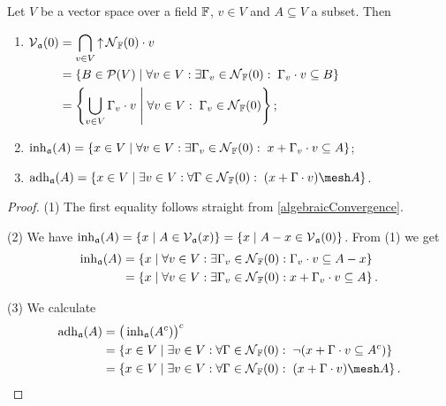 \begin{lemma} \label{constructionsInAlgebraicConvergence}
Let $V$ be a vector space over a field $\mathbb{F}$, $v\in V$ and $A\subseteq V$ a subset. Then
\begin{enumerate}
\item $\begin{aligned}[t]
\operatorname{\mathcal{V}}_\mathfrak{a}(0) &= \bigcap_{v\in V} \operatorname{\uparrow} \operatorname{\mathcal{N}}_{\mathbb{F}}(0)\cdot v \\
&= \left\{ B\in \operatorname{\mathcal{P}}(V) \;\middle|\; \forall v\in V: \exists \Gamma_v\in \operatorname{\mathcal{N}}_{\mathbb{F}}(0):\; \Gamma_v\cdot v\subseteq B \right\} \\
&= \left\{ \bigcup_{v\in V} \Gamma_v\cdot v \;\middle|\; \forall v\in V:\; \Gamma_v \in \operatorname{\mathcal{N}}_{\mathbb{F}}(0) \right\};
\end{aligned}$
\item $\operatorname{inh}_\mathfrak{a}(A) = \left\{ x\in V \;\middle|\; \forall v\in V:\exists \Gamma_v \in \operatorname{\mathcal{N}}_{\mathbb{F}}(0):\; x + \Gamma_v\cdot v \subseteq A \right\}$;
\item $\adh_\mathfrak{a}(A) = \setbuilder{x\in V}{\exists v\in V: \forall \Gamma\in\neighbourhood_\F(0):\; (x+\Gamma\cdot v)\mesh A}$.
\end{enumerate}
\end{lemma}
\begin{proof}
(1) The first equality follows straight from \ref{algebraicConvergence}.

(2) We have $\operatorname{inh}_\mathfrak{a}(A) = \left\{ x \;\middle|\; A\in \operatorname{\mathcal{V}}_\mathfrak{a}(x) \right\} = \left\{ x \;\middle|\; A-x\in \operatorname{\mathcal{V}}_\mathfrak{a}(0) \right\}$. From (1) we get 
\begin{align*}
\operatorname{inh}_\mathfrak{a}(A) &= \left\{ x \;\middle|\; \forall v\in V: \exists \Gamma_v\in \operatorname{\mathcal{N}}_{\mathbb{F}}(0): \Gamma_v\cdot v \subseteq A-x \right\} \\
&= \left\{ x \;\middle|\; \forall v\in V: \exists \Gamma_v\in \operatorname{\mathcal{N}}_{\mathbb{F}}(0): x + \Gamma_v\cdot v \subseteq A \right\}.
\end{align*}

(3) We calculate
\begin{align*}
\adh_\mathfrak{a}(A) &= \big(\inh_\mathfrak{a}(A^c)\big)^c \\
&= \setbuilder{x\in V}{\exists v\in V:\forall \Gamma \in \neighbourhood_\F(0):\; \neg(x + \Gamma\cdot v \subseteq A^c)} \\
&= \setbuilder{x\in V}{\exists v\in V:\forall \Gamma \in \neighbourhood_\F(0):\; (x + \Gamma\cdot v) \mesh A}.
\end{align*}
\end{proof}

